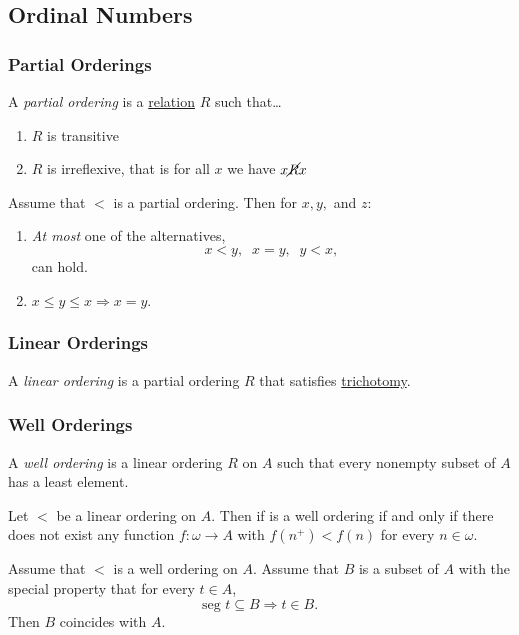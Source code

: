 \subsection{Ordinal Numbers}\label{ordinalnumbers}

\subsubsection{Partial Orderings}\label{partialorderings}
A \emph{partial ordering} is a \hyperref[relation]{relation} $R$ such that\dots
\begin{enumerate}
  \item $R$ is transitive
  \item $R$ is irreflexive, that is for all $x$ we have $x \cancel{R} x$
\end{enumerate}

\begin{proposition}
Assume that $<$ is a partial ordering. Then for $x,y,$ and $z$:
\begin{enumerate}
  \item \emph{At most} one of the alternatives,
  		$$x < y, \; \; x = y, \; \; y < x,$$
  		can hold.
  \item $x \leq y \leq x \Rightarrow x = y.$
\end{enumerate}
\end{proposition}

\subsubsection{Linear Orderings}\label{partialorderings}
A \emph{linear ordering} is a partial ordering $R$ that satisfies \hyperref[trichotomy]{trichotomy}.

\subsubsection{Well Orderings}\label{wellorderings}
A \emph{well ordering} is a linear ordering $R$ on $A$ such that every nonempty subset of $A$ has a least element.

\begin{theorem}
Let $<$ be a linear ordering on $A$. Then if is a well ordering if and only if there does not exist any function $f: \omega \rightarrow A$ with $f(n^+) < f(n)$ for every $n \in \omega$.
\end{theorem}

\begin{theorem}\label{transfiniteinduction}
Assume that $<$ is a well ordering on $A$. Assume that $B$ is a subset of $A$ with the special property that for every $t \in A$,
$$\textrm{seg } t \subseteq B \Rightarrow t \in B.$$
Then $B$ coincides with $A$.
\end{theorem}

